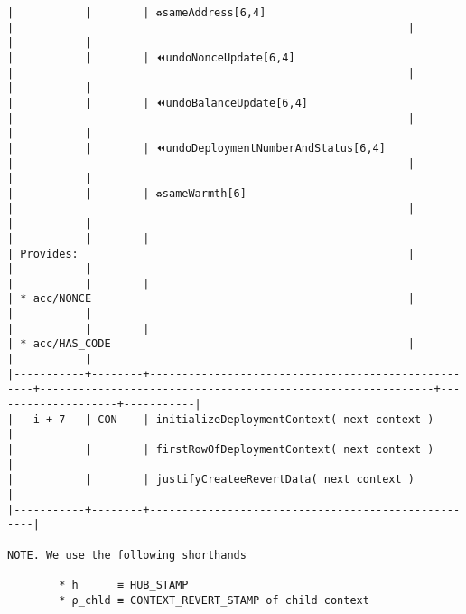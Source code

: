 \documentclass[varwidth=\maxdimen,margin=0.5cm,multi={verbatim}]{standalone}
\begin{document}
\begin{verbatim}
|           |        | ♻️sameAddress[6,4]                                 |                                                             |                    |           |
|           |        | ⏪undoNonceUpdate[6,4]                             |                                                             |                    |           |
|           |        | ⏪undoBalanceUpdate[6,4]                           |                                                             |                    |           |
|           |        | ⏪undoDeploymentNumberAndStatus[6,4]               |                                                             |                    |           |
|           |        | ♻️sameWarmth[6]                                    |                                                             |                    |           |
|           |        |                                                    | Provides:                                                   |                    |           |
|           |        |                                                    | * acc/NONCE                                                 |                    |           |
|           |        |                                                    | * acc/HAS_CODE                                              |                    |           |
|-----------+--------+----------------------------------------------------+-------------------------------------------------------------+--------------------+-----------|
|   i + 7   | CON    | initializeDeploymentContext( next context )        |
|           |        | firstRowOfDeploymentContext( next context )        |
|           |        | justifyCreateeRevertData( next context )           |
|-----------+--------+----------------------------------------------------|

NOTE. We use the following shorthands

        * h      ≡ HUB_STAMP
        * ρ_chld ≡ CONTEXT_REVERT_STAMP of child context

\end{verbatim}
\end{document}
